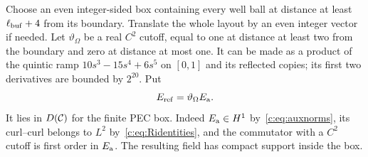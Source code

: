 Choose an even integer-sided box containing every well ball at distance
at least $\ell_{\rm buf}+4$ from its boundary. Translate the whole layout by an even
integer vector if needed. Let $\vartheta_\Omega$ be a real $C^2$ cutoff,
equal to one at distance at least two from the boundary and zero at
distance at most one. It can be made as a product of the quintic ramp
$10s^3-15s^4+6s^5$ on $[0,1]$ and its reflected copies; its first two
derivatives are bounded by $2^{20}$. Put
\begin{equation}
 E_{\rm ref}=\vartheta_\Omega E_{\rm a}.                \label{c:eq:cutfield}
\end{equation}
It lies in $D(\mathcal C)$ for the finite PEC box. Indeed $E_{\rm a}\in H^1$
by~\eqref{c:eq:auxnorms},
its curl--curl belongs to $L^2$ by~\eqref{c:eq:Ridentities}, and the
commutator with a $C^2$ cutoff is first order in $E_{\rm a}$.
The resulting field has compact support inside the box.

